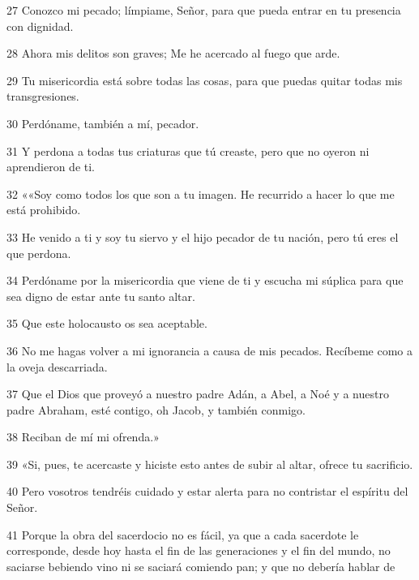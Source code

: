 \par 27 Conozco mi pecado; límpiame, Señor, para que pueda entrar en tu presencia con dignidad.

\par 28 Ahora mis delitos son graves; Me he acercado al fuego que arde.

\par 29 Tu misericordia está sobre todas las cosas, para que puedas quitar todas mis transgresiones.

\par 30 Perdóname, también a mí, pecador.

\par 31 Y perdona a todas tus criaturas que tú creaste, pero que no oyeron ni aprendieron de ti.

\par 32 ««Soy como todos los que son a tu imagen. He recurrido a hacer lo que me está prohibido.

\par 33 He venido a ti y soy tu siervo y el hijo pecador de tu nación, pero tú eres el que perdona.

\par 34 Perdóname por la misericordia que viene de ti y escucha mi súplica para que sea digno de estar ante tu santo altar.

\par 35 Que este holocausto os sea aceptable.

\par 36 No me hagas volver a mi ignorancia a causa de mis pecados. Recíbeme como a la oveja descarriada.

\par 37 Que el Dios que proveyó a nuestro padre Adán, a Abel, a Noé y a nuestro padre Abraham, esté contigo, oh Jacob, y también conmigo.

\par 38 Reciban de mí mi ofrenda.»

\par 39 «Si, pues, te acercaste y hiciste esto antes de subir al altar, ofrece tu sacrificio.

\par 40 Pero vosotros tendréis cuidado y estar alerta para no contristar el espíritu del Señor.

\par 41 Porque la obra del sacerdocio no es fácil, ya que a cada sacerdote le corresponde, desde hoy hasta el fin de las generaciones y el fin del mundo, no saciarse bebiendo vino ni se saciará comiendo pan; y que no debería hablar de

